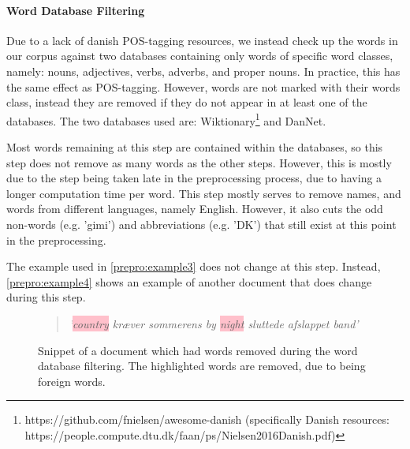 \paragraph{Word Database Filtering}
Due to a lack of danish POS-tagging resources, we instead check up the words in our corpus against two databases containing only words of specific word classes, namely: nouns, adjectives, verbs, adverbs, and proper nouns.
In practice, this has the same effect as POS-tagging.
However, words are not marked with their words class, instead they are removed if they do not appear in at least one of the databases.
The two databases used are:  Wiktionary\footnote{https://github.com/fnielsen/awesome-danish (specifically Danish resources: https://people.compute.dtu.dk/faan/ps/Nielsen2016Danish.pdf)} and DanNet\cite{Pedersen2009DanNetTC}. 

Most words remaining at this step are contained within the databases, so this step does not remove as many words as the other steps.
However, this is mostly due to the step being taken late in the preprocessing process, due to having a longer computation time per word.
This step mostly serves to remove names, and words from different languages, namely English.
However, it also cuts the odd non-words (e.g. 'gimi') and abbreviations (e.g. 'DK') that still exist at this point in the preprocessing.

The example used in \autoref{prepro:example3} does not change at this step. 
Instead, \autoref{prepro:example4} shows an example of another document that does change during this step.

\begin{figure}[h]
	\begin{framed}
		\begin{quote}
			\textit{
				'\colorbox{pink}{country} kræver sommerens by \colorbox{pink}{night} sluttede afslappet band'
			}
		\end{quote}
	\end{framed}
	\caption{Snippet of a document which had words removed during the word database filtering. The highlighted words are removed, due to being foreign words.}
	\label{prepro:example4}
\end{figure}

